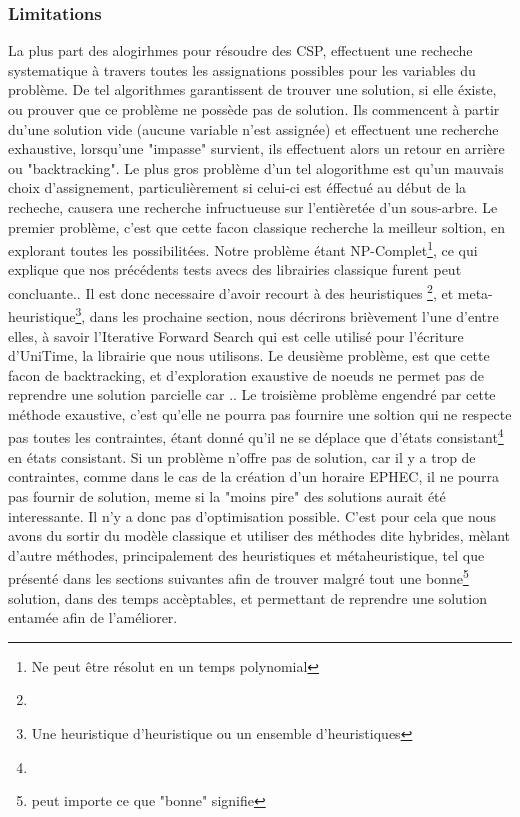\subsubsection{Limitations}
La plus part des alogirhmes pour résoudre des CSP, effectuent une recheche systematique à travers toutes les assignations possibles pour les variables du problème. De tel algorithmes garantissent de trouver une solution, si elle éxiste, ou prouver que ce problème ne possède pas de solution.  
Ils commencent à partir du'une solution vide (aucune variable n'est assignée) et effectuent une recherche exhaustive,
lorsqu'une "impasse" survient, ils effectuent alors un retour en arrière ou "backtracking".  
Le plus gros problème d'un tel alogorithme est qu'un mauvais choix d'assignement,
 particulièrement si celui-ci est éffectué au début de la recheche, causera une recherche infructueuse sur l'entièretée d'un sous-arbre. 
Le premier problème, c'est que cette facon classique recherche la meilleur soltion, en explorant toutes les possibilitées. Notre problème étant NP-Complet\footnote{Ne peut être résolut en un temps polynomial}, ce qui explique que nos précédents tests avecs des librairies classique furent peut concluante.\newline.
Il est donc necessaire d'avoir recourt à des heuristiques \footnote{}, et meta-heuristique\footnote{Une heuristique d'heuristique ou un ensemble d'heuristiques}, dans les prochaine section, nous décrirons brièvement l'une d'entre elles, à savoir l'Iterative Forward Search qui est celle utilisé pour l'écriture d'UniTime, la librairie que nous utilisons.
\newline
\indent
Le deusième problème, est que cette facon de backtracking, et d'exploration exaustive de noeuds ne permet pas de reprendre une solution parcielle car ..
\newline
\indent
Le troisième problème engendré par cette méthode exaustive, c'est qu'elle ne pourra pas fournire une soltion qui ne respecte pas toutes les contraintes, étant donné qu'il ne se déplace que d'états consistant\footnote{} en états consistant. Si un problème n'offre pas de solution, car il y a trop de contraintes, comme dans le cas de la création d'un horaire EPHEC, il ne pourra pas fournir de solution, meme si la "moins pire" des solutions aurait été interessante. Il n'y a donc pas d'optimisation possible.
\newline
\indent
C'est pour cela que nous avons du sortir du modèle classique et utiliser des méthodes dite hybrides, mèlant d'autre méthodes, principalement des heuristiques et métaheuristique, tel que présenté dans les sections suivantes afin de trouver malgré tout une bonne\footnote{peut importe ce que "bonne" signifie} solution, dans des temps accèptables, et permettant de reprendre une solution entamée afin de l'améliorer. \newline
